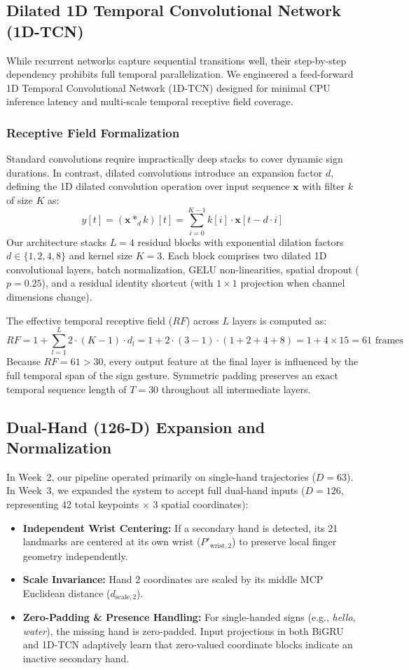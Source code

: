 \documentclass{article}
\begin{document}
\subsection*{Dilated 1D Temporal Convolutional Network (1D-TCN)}
While recurrent networks capture sequential transitions well, their step-by-step dependency prohibits full temporal parallelization. We engineered a feed-forward 1D Temporal Convolutional Network (1D-TCN) designed for minimal CPU inference latency and multi-scale temporal receptive field coverage.

\subsubsection*{Receptive Field Formalization}
Standard convolutions require impractically deep stacks to cover dynamic sign durations. In contrast, dilated convolutions introduce an expansion factor $d$, defining the 1D dilated convolution operation over input sequence $\mathbf{x}$ with filter $k$ of size $K$ as:
\[
    y[t] = (\mathbf{x} *_d k)[t] = \sum_{i=0}^{K-1} k[i] \cdot \mathbf{x}[t - d \cdot i]
\]
Our architecture stacks $L = 4$ residual blocks with exponential dilation factors $d \in \{1, 2, 4, 8\}$ and kernel size $K = 3$. Each block comprises two dilated 1D convolutional layers, batch normalization, GELU non-linearities, spatial dropout ($p = 0.25$), and a residual identity shortcut (with $1 \times 1$ projection when channel dimensions change).

The effective temporal receptive field ($RF$) across $L$ layers is computed as:
\[
    RF = 1 + \sum_{l=1}^L 2 \cdot (K - 1) \cdot d_l = 1 + 2 \cdot (3 - 1) \cdot (1 + 2 + 4 + 8) = 1 + 4 \times 15 = 61 \text{ frames}
\]
Because $RF = 61 > 30$, every output feature at the final layer is influenced by the full temporal span of the sign gesture. Symmetric padding preserves an exact temporal sequence length of $T = 30$ throughout all intermediate layers.

\subsection*{Dual-Hand (126-D) Expansion and Normalization}
In Week~2, our pipeline operated primarily on single-hand trajectories ($D = 63$). In Week~3, we expanded the system to accept full dual-hand inputs ($D = 126$, representing 42 total keypoints $\times$ 3 spatial coordinates):
\begin{itemize}
    \item \textbf{Independent Wrist Centering:} If a secondary hand is detected, its 21 landmarks are centered at its own wrist ($P'_{\text{wrist}, 2}$) to preserve local finger geometry independently.
    \item \textbf{Scale Invariance:} Hand 2 coordinates are scaled by its middle MCP Euclidean distance ($d_{\text{scale}, 2}$).
    \item \textbf{Zero-Padding \& Presence Handling:} For single-handed signs (e.g., \textit{hello}, \textit{water}), the missing hand is zero-padded. Input projections in both BiGRU and 1D-TCN adaptively learn that zero-valued coordinate blocks indicate an inactive secondary hand.
\end{itemize}
\end{document}

